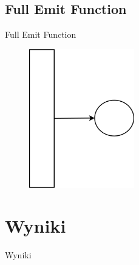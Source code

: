 \documentclass{beamer}
\begin{document}
\subsection*{Full Emit Function}

\begin{frame}{Full Emit Function}
\begin{figure}[H]
	\begin{center}
  		\includegraphics[height=6cm]{PresentationFull.png}
	\end{center}
\end{figure}
\end{frame}




\section{Wyniki}
\begin{frame}{}
\begin{center}
\huge{Wyniki}
\end{center}
\end{frame}
\end{document}
